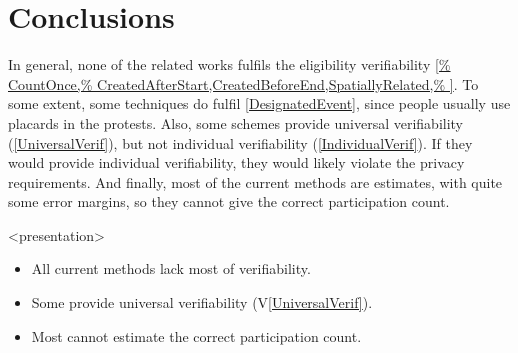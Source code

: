 \mode*
\section{Conclusions}

In general, none of the related works fulfils the eligibility verifiability 
\cref{%
  CountOnce,%
  CreatedAfterStart,CreatedBeforeEnd,SpatiallyRelated,%
}.
To some extent, some techniques do fulfil \cref{DesignatedEvent}, since people 
usually use placards in the protests.
Also, some schemes provide universal verifiability (\cref{UniversalVerif}), but 
not individual verifiability (\cref{IndividualVerif}).
If they would provide individual verifiability, they would likely violate the 
privacy requirements.
And finally, most of the current methods are estimates, with quite some error 
margins, so they cannot give the correct participation count.

\begin{frame}<presentation>
  \begin{remark}
    \begin{itemize}
      \item All current methods lack most of verifiability.
      \item Some provide universal verifiability (V\ref{UniversalVerif}).

        \pause

      \item Most cannot estimate the correct participation count.
    \end{itemize}
  \end{remark}
\end{frame}
